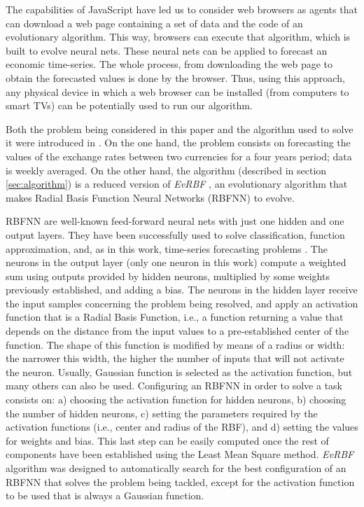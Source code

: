 \documentclass{article}
\begin{document}
The capabilities of JavaScript have led us to consider web browsers as agents that can download a web page containing a set
of data and the code of an evolutionary algorithm. This way, browsers can execute that algorithm, which is built to evolve neural nets. These neural nets can be applied to forecast an economic time-series. The whole process, from downloading the web page to obtain the forecasted values is done by the browser. Thus, using
this approach, any physical device in which a web browser can be installed (from
computers to smart TVs) can be potentially used to run our algorithm.

Both the problem being considered in this paper and the algorithm used
to solve it were introduced in \cite{rivas03:EvRBF}. On the one hand,
the problem consists on forecasting the values of the exchange rates
between two currencies for a four years period; data is weekly averaged. %
On the other hand, the algorithm (described in
section \ref{sec:algorithm}) is a reduced version of {\em EvRBF}
\cite{rivas03:EvRBF}, an evolutionary algorithm that makes Radial Basis
Function Neural Networks (RBFNN) to evolve.

RBFNN are well-known feed-forward neural nets with just one hidden and
one output layers. %
They have been successfully used to solve classification, function
approximation, and, as in this work, time-series forecasting problems
\cite{Broomhead88,Keogh03,Whitehead}.
The neurons in the output layer (only one neuron in this work) compute a weighted sum using outputs provided by hidden neurons, multiplied by some weights previously established, and adding a bias. The neurons in the hidden layer receive the input samples concerning the problem being resolved, and apply an activation function that  is a Radial Basis Function, i.e., a function returning a value that depends on the distance from the input values to a pre-established center of the function. The shape of this function is modified by means of a radius or width: the narrower this width, the higher the number of inputs that will not activate the neuron. Usually, Gaussian function is selected as the activation function, but many others can also be used.
Configuring an RBFNN in order to solve a task consists on: a) choosing
the activation function for hidden neurons, b) choosing the number of
hidden neurons, c) setting the parameters required by the activation
functions (i.e., center and radius of the RBF), and d) setting the
values for weights and bias. This last step can be easily computed
once the rest of components have been established using the Least Mean
Square method. {\em EvRBF} algorithm was designed to automatically
search for the best configuration of an RBFNN that solves the problem
being tackled, except for the activation function to be used that is
always a Gaussian function.
\end{document}
